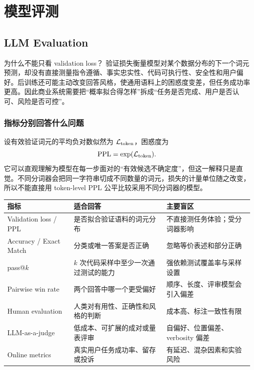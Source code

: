 \part{模型评测}

\chapter{LLM Evaluation}\label{sec:evaluation}

\begin{motivationbox}{为什么不能只看 validation loss？}
验证损失衡量模型对某个数据分布的下一个词元预测，却没有直接测量指令遵循、事实忠实性、代码可执行性、安全性和用户偏好。后训练还可能主动改变回答风格，使通用语料上的困惑度变差，但任务成功率更高。因此商业系统需要把“概率拟合得怎样”拆成“任务是否完成、用户是否认可、风险是否可控”。
\end{motivationbox}

\section{指标分别回答什么问题}

设有效验证词元的平均负对数似然为 $\mathcal L_{\rm token}$，困惑度为
\[
\operatorname{PPL}=\exp(\mathcal L_{\rm token}).
\]
它可以直观理解为模型在每一步面对的“有效候选不确定度”，但这一解释只是直觉。不同分词器会把同一字符串切成不同数量的词元，损失的计量单位随之改变，所以不能直接用 token-level PPL 公平比较采用不同分词器的模型。

\begin{center}
\small
\begin{tabularx}{0.96\textwidth}{lYY}
\toprule
指标 & 适合回答 & 主要盲区\\
\midrule
Validation loss / PPL & 是否拟合验证语料的词元分布 & 不直接测任务体验；受分词器影响\\
Accuracy / Exact Match & 分类或唯一答案是否正确 & 忽略等价表述和部分正确\\
pass@$k$ & $k$ 次代码采样中至少一次通过测试的能力 & 强依赖测试覆盖率与采样设置\\
Pairwise win rate & 两个回答中哪一个更受偏好 & 顺序、长度、评审模型会引入偏差\\
Human evaluation & 人类对有用性、正确性和风格的判断 & 成本高、标注一致性有限\\
LLM-as-a-judge & 低成本、可扩展的成对或量表评审 & 自偏好、位置偏差、 verbosity 偏差\\
Online metrics & 真实用户任务成功率、留存或投诉 & 有延迟、混杂因素和实验风险\\
\bottomrule
\end{tabularx}
\end{center}

